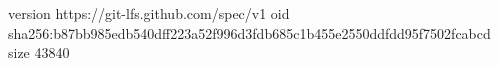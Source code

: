 version https://git-lfs.github.com/spec/v1
oid sha256:b87bb985edb540dff223a52f996d3fdb685c1b455e2550ddfdd95f7502fcabcd
size 43840
